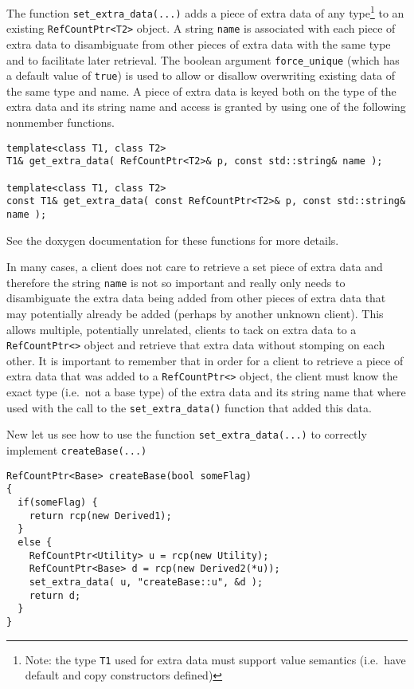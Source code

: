 The function {}\texttt{set\-\_extra\-\_data(...)} adds a piece of
extra data of any type\footnote{Note: the type {}\texttt{T1} used for
extra data must support value semantics (i.e.~have default and copy
constructors defined)} to an existing {}\texttt{RefCountPtr<T2>}
object.  A string \texttt{name} is associated with each piece of extra
data to disambiguate from other pieces of extra data with the same
type and to facilitate later retrieval.  The boolean argument
\texttt{force\-\_unique} (which has a default value of \texttt{true})
is used to allow or disallow overwriting existing data of the same
type and name.  A piece of extra data is keyed both on the type of the
extra data and its string name and access is granted by using one of
the following nonmember functions.

{\scriptsize\begin{verbatim}
template<class T1, class T2>
T1& get_extra_data( RefCountPtr<T2>& p, const std::string& name );

template<class T1, class T2>
const T1& get_extra_data( const RefCountPtr<T2>& p, const std::string& name );
\end{verbatim}}

{}\noindent{} See the doxygen documentation for these functions for
more details.

In many cases, a client does not care to retrieve a set piece of extra
data and therefore the string \texttt{name} is not so important and
really only needs to disambiguate the extra data being added from
other pieces of extra data that may potentially already be added
(perhaps by another unknown client).  This allows multiple,
potentially unrelated, clients to tack on extra data to a
{}\texttt{RefCountPtr<>} object and retrieve that extra data without
stomping on each other.  It is important to remember that in order for
a client to retrieve a piece of extra data that was added to a
{}\texttt{RefCountPtr<>} object, the client must know the exact type
(i.e.~not a base type) of the extra data and its string name that
where used with the call to the {}\texttt{set\-\_extra\-\_data()}
function that added this data.

New let us see how to use the function {}\texttt{set\-\_extra\-\_data(...)}
to correctly implement {}\texttt{create\-Base(...)}

{\scriptsize\begin{verbatim}
RefCountPtr<Base> createBase(bool someFlag)
{
  if(someFlag) {
    return rcp(new Derived1);
  }
  else {
    RefCountPtr<Utility> u = rcp(new Utility);
    RefCountPtr<Base> d = rcp(new Derived2(*u));
    set_extra_data( u, "createBase::u", &d );
    return d;
  }
}
\end{verbatim}}

